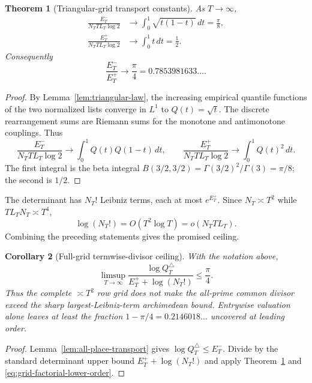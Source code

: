\documentclass[11pt,oneside]{article}
\newtheorem{theorem}{Theorem}[section]
\newtheorem{corollary}[theorem]{Corollary}
\theoremstyle{definition}
\theoremstyle{remark}
\begin{document}
\begin{theorem}[Triangular-grid transport constants]\label{thm:grid-transport}
As $T\to\infty$,
\begin{align}
 \frac{E_T^-}{N_TTL_T\log2}
   &\longrightarrow
     \int_0^1\sqrt{t(1-t)}\,dt
      =\frac\pi8, \label{eq:grid-min-limit}\\
 \frac{E_T^+}{N_TTL_T\log2}
   &\longrightarrow
     \int_0^1t\,dt
      =\frac12. \label{eq:grid-max-limit}
\end{align}
Consequently
\begin{equation}\label{eq:grid-ratio}
 \frac{E_T^-}{E_T^+}\longrightarrow\frac\pi4
 =0.7853981633\ldots .
\end{equation}
\end{theorem}

\begin{proof}
By Lemma~\ref{lem:triangular-law}, the increasing empirical quantile functions of the two
normalized lists converge in $L^1$ to $Q(t)=\sqrt t$.  The discrete rearrangement sums are
Riemann sums for the monotone and antimonotone couplings.  Thus
\[
 \frac{E_T^-}{N_TTL_T\log2}
 \longrightarrow\int_0^1Q(t)Q(1-t)\,dt,
 \qquad
 \frac{E_T^+}{N_TTL_T\log2}
 \longrightarrow\int_0^1Q(t)^2\,dt.
\]
The first integral is the beta integral
$B(3/2,3/2)=\Gamma(3/2)^2/\Gamma(3)=\pi/8$; the second is $1/2$.
\end{proof}

The determinant has $N_T!$ Leibniz terms, each at most $e^{E_T^+}$.
Since $N_T\asymp T^2$ while $TL_TN_T\asymp T^4$,
\begin{equation}\label{eq:grid-factorial-lower-order}
 \log(N_T!)=O(T^2\log T)=o(N_TTL_T).
\end{equation}
Combining the preceding statements gives the promised ceiling.

\begin{corollary}[Full-grid termwise-divisor ceiling]\label{cor:grid-pi-four}
With the notation above,
\begin{equation}\label{eq:grid-pi-four}
 \limsup_{T\to\infty}
 \frac{\log Q_T^{\triangle}}
      {E_T^++\log(N_T!)}
 \le\frac\pi4.
\end{equation}
Thus the complete $\asymp T^2$ row grid does not make the all-prime common divisor exceed the
sharp largest-Leibniz-term archimedean bound.  Entrywise valuation alone leaves at least the
fraction $1-\pi/4=0.2146018\ldots$ uncovered at leading order.
\end{corollary}

\begin{proof}
Lemma~\ref{lem:all-place-transport} gives
$\log Q_T^{\triangle}\le E_T^-$.  Divide by the standard determinant upper bound
$E_T^++\log(N_T!)$ and apply Theorem~\ref{thm:grid-transport} and
\eqref{eq:grid-factorial-lower-order}.
\end{proof}
\end{document}
